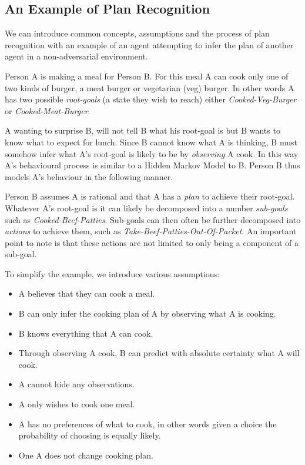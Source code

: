 \documentclass[parskip]{cs4rep}
\begin{document}
\subsection{An Example of Plan Recognition}

We can introduce common concepts, assumptions and the process of plan recognition with an example of an agent attempting to infer the plan of another agent in a non-adversarial environment. 

Person A is making a meal for Person B. For this meal A can cook only one of two kinds of burger, a meat burger or vegetarian (veg) burger. In other words A has two possible \textit{root-goals} (a state they wish to reach) either \textit{Cooked-Veg-Burger} or \textit{Cooked-Meat-Burger}. 

A wanting to surprise B, will not tell B what his root-goal is but B wants to know what to expect for lunch. Since B cannot know what A is thinking, B must somehow infer what A's root-goal is likely to be by \textit{observing} A cook. In this way A's behavioural process is similar to a Hidden Markov Model to B. Person B thus models A's behaviour in the following manner. 

Person B assumes A is rational and that A has a \textit{plan} to achieve their root-goal. Whatever A's root-goal is it can likely be decomposed into a number \textit{sub-goals} such as \textit{Cooked-Beef-Patties}. Sub-goals can then often be further decomposed into \textit{actions} to achieve them, such as \textit{Take-Beef-Patties-Out-Of-Packet}. An important point to note is that these actions are not limited to only being a component of a sub-goal.

To simplify the example, we introduce various assumptions:

\begin{itemize}
\item
A believes that they can cook a meal.
\item
B can only infer the cooking plan of A by observing what A is cooking.
\item
B knows everything that A can cook.
\item
Through observing A cook, B can predict with absolute certainty what A will cook.
\item
A cannot hide any observations.
\item
A only wishes to cook one meal.
\item
A has no preferences of what to cook, in other words given a choice the probability of choosing is equally likely.
\item
One A does not change cooking plan.
\end{itemize}
\end{document}
